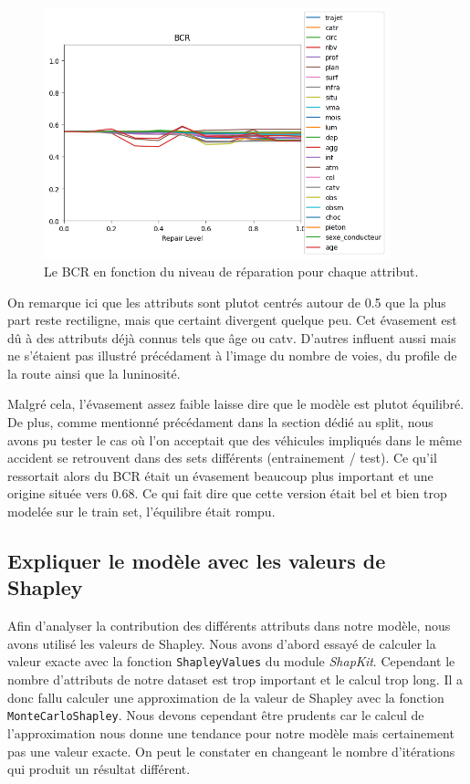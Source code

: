 \documentclass{article}
\begin{document}
    \begin{figure}[h]
        \centering
        \includegraphics[width=10cm]{./img/BCR.png}
        \caption{Le BCR en fonction du niveau de réparation pour chaque attribut.}
    \end{figure}

    On remarque ici que les attributs sont plutot centrés autour de 0.5 que la plus part reste rectiligne, mais que certaint divergent
    quelque peu. Cet évasement est dû à des attributs déjà connus tels que âge ou catv. D'autres influent aussi mais ne s'étaient pas 
    illustré précédament à l'image du nombre de voies, du profile de la route ainsi que la luninosité. 

    Malgré cela, l'évasement assez faible laisse dire que le modèle est plutot équilibré. De plus, comme mentionné précédament 
    dans la section dédié au split, nous avons pu tester le cas où l'on acceptait que des véhicules impliqués dans le même accident
    se retrouvent dans des sets différents (entrainement / test). Ce qu'il ressortait alors du BCR était un évasement beaucoup
    plus important et une origine située vers 0.68. Ce qui fait dire que cette version était bel et bien trop modelée sur le train
    set, l'équilibre était rompu.

    \subsection{Expliquer le modèle avec les valeurs de Shapley}
    Afin d'analyser la contribution des différents attributs dans notre modèle, nous avons 
    utilisé les valeurs de Shapley. Nous avons d'abord essayé de calculer la valeur exacte avec la fonction 
    \verb|ShapleyValues| du module \textit{ShapKit}. Cependant le nombre d'attributs de notre dataset est trop 
    important et le calcul trop long.
    Il a donc fallu calculer une approximation de la valeur de Shapley avec la fonction \verb|MonteCarloShapley|.
    Nous devons cependant être prudents car le calcul de l'approximation nous 
    donne une tendance pour notre modèle mais certainement pas une valeur exacte. On peut le constater en changeant 
    le nombre d'itérations qui produit un résultat différent.
\end{document}
